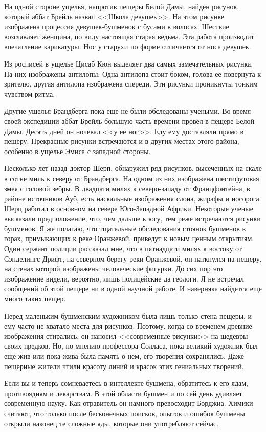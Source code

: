\documentclass[12pt,a4paper,twoside,openany,svgnames]{memoir}
\begin{document}
На одной стороне ущелья, напротив пещеры Белой Дамы, найден рисунок, который аббат Брейль назвал <<Школа девушек>>. На этом рисунке изображена процессия девушек-бушменок с бусами в волосах. Шествие возглавляет женщина, по виду настоящая старая ведьма. Эта работа производит впечатление карикатуры. Нос у старухи по форме отличается от носа девушек.

Из росписей в ущелье Цисаб Кюн выделяет два самых замечательных рисунка. На них изображены антилопы. Одна антилопа стоит боком, голова ее повернута к зрителю, другая антилопа изображена спереди. Эти рисунки проникнуты тонким чувством ритма.

Другие ущелья Брандберга пока еще не были обследованы учеными. Во время своей экспедиции аббат Брейль большую часть времени провел в пещере Белой Дамы. Десять дней он ночевал <<у ее ног>>. Еду ему доставляли прямо в пещеру. Прекрасные рисунки встречаются и в других местах этого района, особенно в ущелье Эмиса с западной стороны.

Несколько лет назад доктор Шерп, обнаружил ряд рисунков, высеченных на скале в сотне миль к северу от Брандберга. На одном из них изображена шестифутовая змея с головой зебры. В двадцати милях к северо-западу от Францфонтейна, в районе источников Ауб, есть наскальные изображения слона, жирафы и носорога. Шерц работал в основном на севере Юго-Западной Африки. Некоторые ученые высказали предположение, что, чем дальше к югу, тем реже встречаются рисунки бушменов. Я же полагаю, что тщательные обследования стоянок бушменов в горах, примыкающих к реке Оранжевой, приведут к новым ценным открытиям. Один сержант полиции рассказал мне, что в пятнадцати милях к востоку от Сэнделингс Дрифт, на северном берегу реки Оранжевой, он наткнулся на пещеру, на стенах которой изображены человеческие фигурки. До сих пор это изображение видели, вероятно, лишь полицейские да геологи. Я не встречал сообщений об этой пещере ни в одной научной работе. И наверняка найдется еще много таких пещер.

Перед маленьким бушменским художником была лишь только стена пещеры, и ему часто не хватало места для рисунков. Поэтому, когда со временем древние изображения стирались, он наносил <<современные рисунки>> на шедевры своих предков. Но, по мнению профессора Солласа, пока великий художник был еще жив или пока жива была память о нем, его творения сохранялись. Даже пещерные жители чтили красоту линий и красок этих гениальных творений.

Если вы и теперь сомневаетесь в интеллекте бушмена, обратитесь к его ядам, противоядиям и лекарствам. В этой области бушмен и по сей день удивляет современную науку. Как отравитель он намного превосходит Борджиа. Химики считают, что только после бесконечных поисков, опытов и ошибок бушмены открыли наконец те сложные яды, которые они употребляют сейчас.
\end{document}
